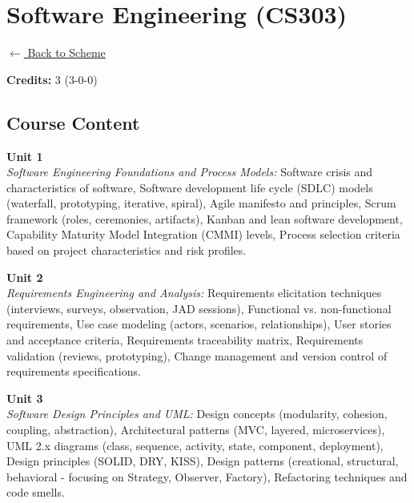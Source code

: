 \section*{Software Engineering (CS303)}
\label{course:CS303}

\noindent \small{\hyperref[main:scheme]{$\leftarrow$ Back to Scheme}} \vspace{0.5cm}

\noindent \textbf{Credits:} 3 (3-0-0)

\subsection*{Course Content}
\noindent\textbf{Unit 1} \\
\textit{Software Engineering Foundations and Process Models:} Software crisis and characteristics of software, Software development life cycle (SDLC) models (waterfall, prototyping, iterative, spiral), Agile manifesto and principles, Scrum framework (roles, ceremonies, artifacts), Kanban and lean software development, Capability Maturity Model Integration (CMMI) levels, Process selection criteria based on project characteristics and risk profiles.

\vspace{0.3cm}

\noindent\textbf{Unit 2} \\
\textit{Requirements Engineering and Analysis:} Requirements elicitation techniques (interviews, surveys, observation, JAD sessions), Functional vs. non-functional requirements, Use case modeling (actors, scenarios, relationships), User stories and acceptance criteria, Requirements traceability matrix, Requirements validation (reviews, prototyping), Change management and version control of requirements specifications.

\vspace{0.3cm}

\noindent\textbf{Unit 3} \\
\textit{Software Design Principles and UML:} Design concepts (modularity, cohesion, coupling, abstraction), Architectural patterns (MVC, layered, microservices), UML 2.x diagrams (class, sequence, activity, state, component, deployment), Design principles (SOLID, DRY, KISS), Design patterns (creational, structural, behavioral - focusing on Strategy, Observer, Factory), Refactoring techniques and code smells.

\vspace{0.3cm}

